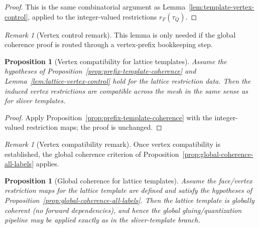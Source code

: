 \documentclass[11pt]{article}
\numberwithin{equation}{section}  %
\theoremstyle{plain}
\newtheorem{proposition}[theorem]{Proposition}
\theoremstyle{definition}
\theoremstyle{remark}
\newtheorem{remark}[theorem]{Remark}
\begin{document}
\begin{proof}
This is the same combinatorial argument as Lemma~\ref{lem:template-vertex-control}, applied to the integer-valued restrictions $r_F(\tau_Q)$.
\end{proof}

%
\begin{remark}[Vertex control remark]\label{rem:lattice-vertex-control}
This lemma is only needed if the global coherence proof is routed through a vertex-prefix bookkeeping step.
\end{remark}


%
\begin{proposition}[Vertex compatibility for lattice templates]\label{prop:lattice-vertex-compatibility}
Assume the hypotheses of Proposition~\ref{prop:prefix-template-coherence} and Lemma~\ref{lem:lattice-vertex-control} hold for the lattice
restriction data. Then the induced vertex restrictions are compatible across the mesh in the same sense as for sliver templates.
\end{proposition}

\begin{proof}
Apply Proposition~\ref{prop:prefix-template-coherence} with the integer-valued restriction maps; the proof is unchanged.
\end{proof}

%
\begin{remark}[Vertex compatibility remark]\label{rem:lattice-vertex-compatibility}
Once vertex compatibility is established, the global coherence criterion of Proposition~\ref{prop:global-coherence-all-labels} applies.
\end{remark}


%
\begin{proposition}[Global coherence for lattice templates]\label{prop:lattice-global-coherence}
Assume the face/vertex restriction maps for the lattice template are defined and satisfy the hypotheses of
Proposition~\ref{prop:global-coherence-all-labels}. Then the lattice template is globally coherent (no forward dependencies), and hence the
global gluing/quantization pipeline may be applied exactly as in the sliver-template branch.
\end{proposition}
\end{document}
